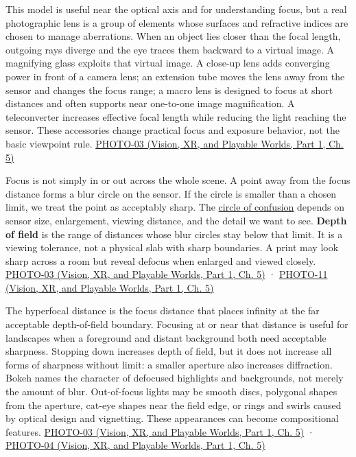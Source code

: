 This model is useful near the optical axis and for understanding focus, but a real photographic lens is a group of elements whose surfaces and refractive indices are chosen to manage aberrations. When an object lies closer than the focal length, outgoing rays diverge and the eye traces them backward to a virtual image. A magnifying glass exploits that virtual image. A close-up lens adds converging power in front of a camera lens; an extension tube moves the lens away from the sensor and changes the focus range; a macro lens is designed to focus at short distances and often supports near one-to-one image magnification. A teleconverter increases effective focal length while reducing the light reaching the sensor. These accessories change practical focus and exposure behavior, not the basic viewpoint rule. \href{../07-Vision-XR-and-Playable-Worlds-P01/main.pdf\#nameddest=04-visual-computing-ii-ch036-photo-03---photography-session-03}{PHOTO-03 (Vision, XR, and Playable Worlds, Part 1, Ch. 5)}

Focus is not simply in or out across the whole scene. A point away from the focus distance forms a blur circle on the sensor. If the circle is smaller than a chosen limit, we treat the point as acceptably sharp. The \hyperref[appendix-21f8456e2629]{circle of confusion} depends on sensor size, enlargement, viewing distance, and the detail we want to see. \textbf{Depth of field} is the range of distances whose blur circles stay below that limit. It is a viewing tolerance, not a physical slab with sharp boundaries. A print may look sharp across a room but reveal defocus when enlarged and viewed closely. \href{../07-Vision-XR-and-Playable-Worlds-P01/main.pdf\#nameddest=04-visual-computing-ii-ch036-photo-03---photography-session-03}{PHOTO-03 (Vision, XR, and Playable Worlds, Part 1, Ch. 5)} · \href{../07-Vision-XR-and-Playable-Worlds-P01/main.pdf\#nameddest=04-visual-computing-ii-ch036-photo-11---photography-session-11}{PHOTO-11 (Vision, XR, and Playable Worlds, Part 1, Ch. 5)}

The hyperfocal distance is the focus distance that places infinity at the far acceptable depth-of-field boundary. Focusing at or near that distance is useful for landscapes when a foreground and distant background both need acceptable sharpness. Stopping down increases depth of field, but it does not increase all forms of sharpness without limit: a smaller aperture also increases diffraction. Bokeh names the character of defocused highlights and backgrounds, not merely the amount of blur. Out-of-focus lights may be smooth discs, polygonal shapes from the aperture, cat-eye shapes near the field edge, or rings and swirls caused by optical design and vignetting. These appearances can become compositional features. \href{../07-Vision-XR-and-Playable-Worlds-P01/main.pdf\#nameddest=04-visual-computing-ii-ch036-photo-03---photography-session-03}{PHOTO-03 (Vision, XR, and Playable Worlds, Part 1, Ch. 5)} · \href{../07-Vision-XR-and-Playable-Worlds-P01/main.pdf\#nameddest=04-visual-computing-ii-ch036-photo-04---photography-session-04}{PHOTO-04 (Vision, XR, and Playable Worlds, Part 1, Ch. 5)}

